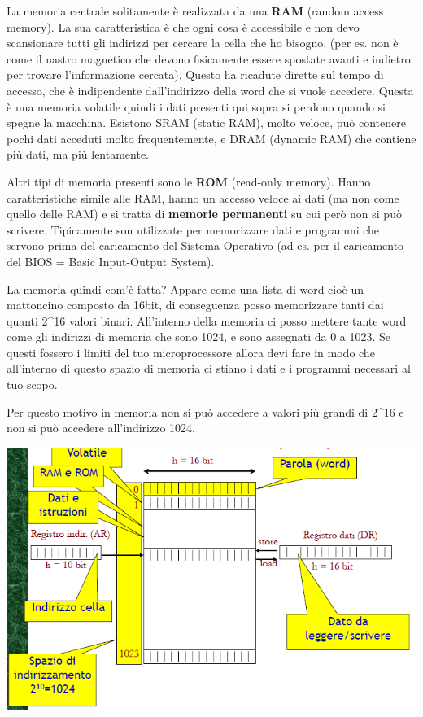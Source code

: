\documentclass[
  paper=a4,
  oneside  ,captions=tableheading
]{scrbook}
\begin{document}
La memoria centrale solitamente è realizzata da una \textbf{RAM} (random
access memory). La sua caratteristica è che ogni cosa è accessibile e
non devo scansionare tutti gli indirizzi per cercare la cella che ho
bisogno. (per es. non è come il nastro magnetico che devono fisicamente
essere spostate avanti e indietro per trovare l'informazione cercata).
Questo ha ricadute dirette sul tempo di accesso, che è indipendente
dall'indirizzo della word che si vuole accedere. Questa è una memoria
volatile quindi i dati presenti qui sopra si perdono quando si spegne la
macchina. Esistono SRAM (static RAM), molto veloce, può contenere pochi
dati acceduti molto frequentemente, e DRAM (dynamic RAM) che contiene
più dati, ma più lentamente.

Altri tipi di memoria presenti sono le \textbf{ROM} (read-only memory).
Hanno caratteristiche simile alle RAM, hanno un accesso veloce ai dati
(ma non come quello delle RAM) e si tratta di \textbf{memorie
permanenti} su cui però non si può scrivere. Tipicamente son utilizzate
per memorizzare dati e programmi che servono prima del caricamento del
Sistema Operativo (ad es. per il caricamento del BIOS = Basic
Input-Output System).

La memoria quindi com'è fatta? Appare come una lista di word cioè un
mattoncino composto da 16bit, di conseguenza posso memorizzare tanti dai
quanti 2\^{}16 valori binari. All'interno della memoria ci posso mettere
tante word come gli indirizzi di memoria che sono 1024, e sono assegnati
da 0 a 1023. Se questi fossero i limiti del tuo microprocessore allora
devi fare in modo che all'interno di questo spazio di memoria ci stiano
i dati e i programmi necessari al tuo scopo.

Per questo motivo in memoria non si può accedere a valori più grandi di
2\^{}16 e non si può accedere all'indirizzo 1024.

\includegraphics{./image/image-20201111185631084.png}
\end{document}
